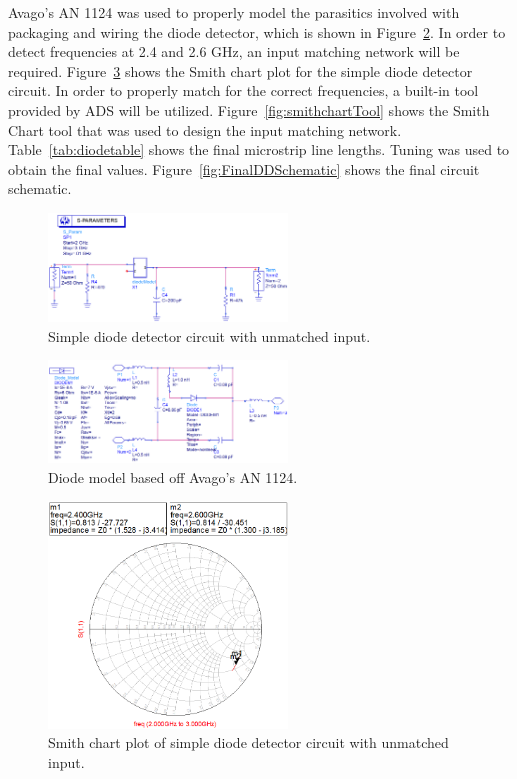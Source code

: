 \documentclass[conference]{IEEEtran}
\begin{document}
Avago's AN 1124\cite{an1124} was used to properly model the parasitics involved with packaging and wiring the diode detector, which is shown in Figure~\ref{fig:diodeModel}. In order to detect frequencies at 2.4 and 2.6 GHz, an input matching network will be required. Figure~\ref{fig:DDPlot} shows the Smith chart plot for the simple diode detector circuit. In order to properly match for the correct frequencies, a built-in tool provided by ADS will be utilized. Figure~\ref{fig:smithchartTool} shows the Smith Chart tool that was used to design the input matching network. Table~\ref{tab:diodetable} shows the final microstrip line lengths. Tuning was used to obtain the final values. Figure~\ref{fig:FinalDDSchematic} shows the final circuit schematic. 

\begin{figure}[!htb]
\centering
\includegraphics[width=2.5in]{diode-pics/diodedetectorSimplifiedSchematic.png}
\caption{Simple diode detector circuit with unmatched input.}
\label{fig:DDSchematic}
\end{figure}

\begin{figure}[!htb]
\centering
\includegraphics[width=2.5in]{diode-pics/diodedetectormodel.png}
\caption{Diode model based off Avago's AN 1124.}
\label{fig:diodeModel}
\end{figure}

\begin{figure}[!htb]
\centering
\includegraphics[width=2.5in]{diode-pics/diodedetectorSimplifiedSmithChart.png}
\caption{Smith chart plot of simple diode detector circuit with unmatched input.}
\label{fig:DDPlot}
\end{figure}
\end{document}
